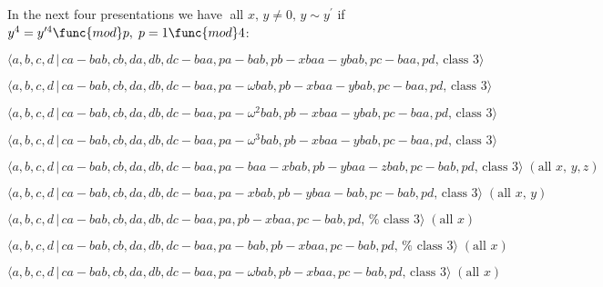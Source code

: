 \documentclass[10pt]{article}
\begin{document}
In the next four presentations we have $\;$all $x,\,y\neq 0,\,y\sim
y^{\prime }$ if $y^{4}=y^{\prime 4}\func{mod}p,\;p=1\func{mod}4$:

\begin{equation}
\langle a,b,c,d\,|\,ca-bab,cb,da,db,dc-baa,pa-bab,pb-xbaa-ybab,pc-baa,pd,\,%
\text{class }3\rangle  \tag{7.3531}
\end{equation}

\begin{equation}
\langle a,b,c,d\,|\,ca-bab,cb,da,db,dc-baa,pa-\omega
bab,pb-xbaa-ybab,pc-baa,pd,\,\text{class }3\rangle  \tag{7.3532}
\end{equation}

\begin{equation}
\langle a,b,c,d\,|\,ca-bab,cb,da,db,dc-baa,pa-\omega
^{2}bab,pb-xbaa-ybab,pc-baa,pd,\,\text{class }3\rangle  \tag{7.3533}
\end{equation}

\begin{equation}
\langle a,b,c,d\,|\,ca-bab,cb,da,db,dc-baa,pa-\omega
^{3}bab,pb-xbaa-ybab,pc-baa,pd,\,\text{class }3\rangle  \tag{7.3534}
\end{equation}

\begin{equation}
\langle
a,b,c,d\,|\,ca-bab,cb,da,db,dc-baa,pa-baa-xbab,pb-ybaa-zbab,pc-bab,pd,\,%
\text{class }3\rangle \;(\text{all }x,\,y,z)  \tag{7.3535}
\end{equation}

\begin{equation}
\langle a,b,c,d\,|\,ca-bab,cb,da,db,dc-baa,pa-xbab,pb-ybaa-bab,pc-bab,pd,\,%
\text{class }3\rangle \;(\text{all }x,\,y)  \tag{7.3536}
\end{equation}

\begin{equation}
\langle a,b,c,d\,|\,ca-bab,cb,da,db,dc-baa,pa,pb-xbaa,pc-bab,pd,\,\text{%
class }3\rangle \;(\text{all }x)  \tag{7.3537}
\end{equation}

\begin{equation}
\langle a,b,c,d\,|\,ca-bab,cb,da,db,dc-baa,pa-bab,pb-xbaa,pc-bab,pd,\,\text{%
class }3\rangle \;(\text{all }x)  \tag{7.3538}
\end{equation}

\begin{equation}
\langle a,b,c,d\,|\,ca-bab,cb,da,db,dc-baa,pa-\omega bab,pb-xbaa,pc-bab,pd,\,%
\text{class }3\rangle \;(\text{all }x)  \tag{7.3539}
\end{equation}
\end{document}
